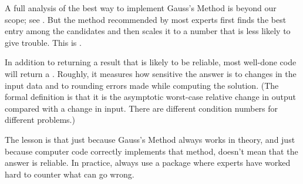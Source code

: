 A full analysis of the best way to implement Gauss's Method 
is beyond our scope; see \cite{Wilkinson65}.
But the method recommended by most experts 
first finds the best entry
among the candidates and then scales it to a number that is less
likely to give trouble.
This is 
.

In addition to returning a result that is likely to be reliable,
most well-done code will return a 
.%
Roughly, it measures how sensitive the answer is to changes in the input data 
and to rounding errors made while computing the solution.
(The formal definition is that it is the asymptotic worst-case relative change 
   in output compared with a change in input.
There are different condition numbers for
different problems.)

The lesson is that
just because Gauss's Method always works in theory, and just
because computer code correctly implements that method,
doesn't mean that the answer is reliable.
In practice, always use a package
where experts have worked hard to counter what can go wrong.

